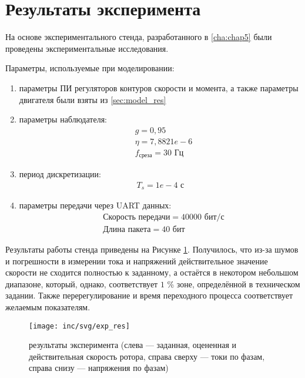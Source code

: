 \section{Результаты эксперимента}

На основе экспериментального стенда, разработанного в \ref{cha:chap5} были проведены экспериментальные исследования.

Параметры, используемые при моделировании:
\begin{enumerate}
	\item параметры ПИ регуляторов контуров скорости и момента, а также параметры двигателя были взяты из \ref{sec:model_res}
	\item параметры наблюдателя:
	\begin{align*}
		&g = 0,95\\
		&\eta = 7,8821e-6\\
		&f_{\textrm{среза}}=30\textrm{ Гц}
	\end{align*}
	\item период дискретизации:
	\begin{align*}
		T_s = 1e-4\textrm{ с}
	\end{align*}
	\item параметры передачи через UART данных:
	\begin{align*}
		&\textrm{Скорость передачи} = 40000 \textrm{ бит/с}\\
		&\textrm{Длина пакета} = 40 \textrm{ бит}
	\end{align*}
\end{enumerate}

Результаты работы стенда приведены на Рисунке \ref{pic:exp_res}. Получилось, что из-за шумов и погрешности в измерении тока и напряжений действительное значение скорости не сходится полностью к заданному, а остаётся в некотором небольшом диапазоне, который, однако, соответствует $1$ \% зоне, определённой в техническом задании. Также перерегулирование и время переходного процесса соответствует желаемым показателям.

\begin{figure}[!h]
\centering
\texttt{[image: inc/svg/exp\_res]}
\caption{результаты эксперимента (слева --- заданная, оцененная и действительная скорость ротора, справа сверху --- токи по фазам, справа снизу --- напряжения по фазам)}
\label{pic:exp_res}
\end{figure}